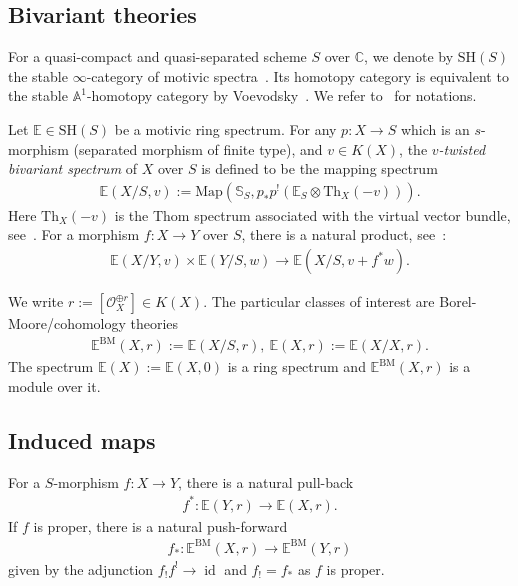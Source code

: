 \documentclass [11pt,oneside,a4paper,mathscr]{amsart}
\theoremstyle{definition}
\newcommand{\id}{\operatorname{id}}
\begin{document}
\subsection{Bivariant theories}
For a quasi-compact and quasi-separated scheme $S$ over $\mathbb{C}$, 
we denote by $\mathrm{SH}(S)$ the stable $\infty$-category of motivic 
spectra~\cite{KhanPhD}. Its homotopy category is equivalent to the stable 
$\mathbb{A}^1$-homotopy category by Voevodsky~\cite{Voev}. 
We refer to~\cite[Section~2]{DJK} for notations. 

Let $\mathbb{E}\in \mathrm{SH}(S)$ be a motivic ring spectrum. 
For any $p \colon X \to S$ which is an $s$-morphism (separated morphism of finite type), and $v\in K(X)$, the \textit{$v$-twisted bivariant spectrum} of $X$ over $S$ is 
defined to be the mapping spectrum 
\begin{align*}
    \mathbb{E}(X/S, v):=\mathrm{Map}(\mathbb{S}_S, p_{*}p^!(\mathbb{E}_S\otimes \mathrm{Th}_X(-v))).
\end{align*}
Here $\mathrm{Th}_X(-v)$ is the Thom spectrum associated with 
the virtual vector bundle, see~\cite[Section~2.1.5]{DJK}. 
For a morphism $f\colon X \to Y$ over $S$, there is a 
natural product, see~\cite[Section~2]{DJK}:
\begin{align*}
    \mathbb{E}(X/Y, v) \times \mathbb{E}(Y/S, w) \to 
    \mathbb{E}(X/S, v+f^* w).
\end{align*}


We write $r:=[\mathcal{O}_X^{\oplus r}] \in K(X).$
The particular classes of interest are 
Borel-Moore/cohomology theories
\begin{align*}
\mathbb{E}^{\mathrm{BM}}(X, r):=\mathbb{E}(X/S, r), \
\mathbb{E}(X, r):=\mathbb{E}(X/X, r).
\end{align*}
The spectrum $\mathbb{E}(X):=\mathbb{E}(X, 0)$ is a ring spectrum and $\mathbb{E}^{\mathrm{BM}}(X, r)$ is a module over it. 

\subsection{Induced maps}
For a $S$-morphism $f \colon X \to Y$, there is a 
natural pull-back 
\begin{align*}
    f^* \colon \mathbb{E}(Y, r) \to \mathbb{E}(X, r). 
\end{align*}
If $f$ is proper, there is a natural push-forward
\begin{align*}
    f_{*} \colon \mathbb{E}^{\mathrm{BM}}(X, r) \to \mathbb{E}^{\mathrm{BM}}(Y, r)
\end{align*}
given by the adjunction $f_{!} f^! \to \id$ and $f_!=f_*$ as $f$ is proper. 
\end{document}
